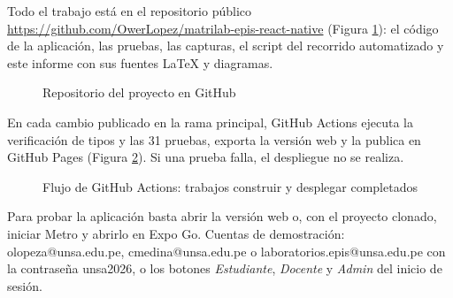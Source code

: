 \vspace{0.2cm}

Todo el trabajo está en el repositorio público \url{https://github.com/OwerLopez/matrilab-epis-react-native} (Figura \ref{fig:repo}): el código de la aplicación, las pruebas, las capturas, el script del recorrido automatizado y este informe con sus fuentes LaTeX y diagramas.

\begin{figure}[!htbp]
\centering
{}
\caption{Repositorio del proyecto en GitHub}
\label{fig:repo}
\end{figure}

En cada cambio publicado en la rama principal, GitHub Actions ejecuta la verificación de tipos y las 31 pruebas, exporta la versión web y la publica en GitHub Pages (Figura \ref{fig:actions}). Si una prueba falla, el despliegue no se realiza.

\begin{figure}[!htbp]
\centering
{}
\caption{Flujo de GitHub Actions: trabajos construir y desplegar completados}
\label{fig:actions}
\end{figure}

Para probar la aplicación basta abrir la versión web o, con el proyecto clonado, iniciar Metro y abrirlo en Expo Go. Cuentas de demostración: olopeza@unsa.edu.pe, cmedina@unsa.edu.pe o laboratorios.epis@unsa.edu.pe con la contraseña unsa2026, o los botones \textit{Estudiante}, \textit{Docente} y \textit{Admin} del inicio de sesión.

